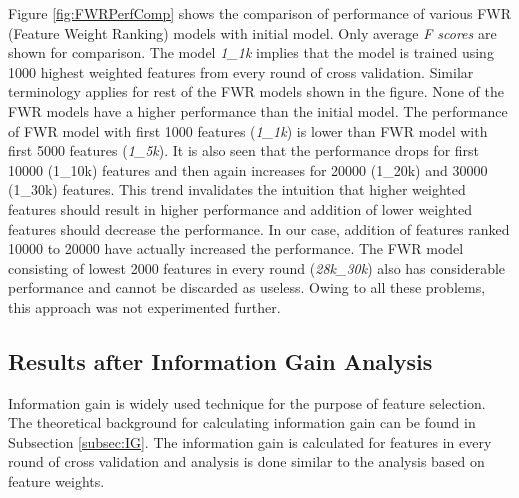 Figure \ref{fig:FWRPerfComp} shows the comparison of performance of various FWR (Feature Weight Ranking) models with initial model. Only average \textit{F scores} are shown for comparison. The model \textit{1\_1k} implies that the model is trained using 1000 highest weighted features from every round of cross validation. Similar terminology applies for rest of the FWR models shown in the figure. None of the FWR models have a higher performance than the initial model. The performance of FWR model with first 1000 features (\textit{1\_1k}) is lower than FWR model with first 5000 features (\textit{1\_5k}). It is also seen that the performance drops for first 10000 (1\_10k) features and then again increases for 20000 (1\_20k) and 30000 (1\_30k) features. This trend invalidates the intuition that higher weighted features should result in higher performance and addition of lower weighted features should decrease the performance. In our case, addition of features ranked 10000 to 20000 have actually increased the performance. The FWR model consisting of lowest 2000 features in every round (\textit{28k\_30k}) also has considerable performance and cannot be discarded as useless. Owing to all these problems, this approach was not experimented further.
 
\subsection{Results after Information Gain Analysis}\label{subsec:SS_IG}

Information gain is widely used technique for the purpose of feature selection. The theoretical background for calculating information gain can be found in Subsection \ref{subsec:IG}. The information gain is calculated for features in every round of cross validation and analysis is done similar to the analysis based on feature weights.

